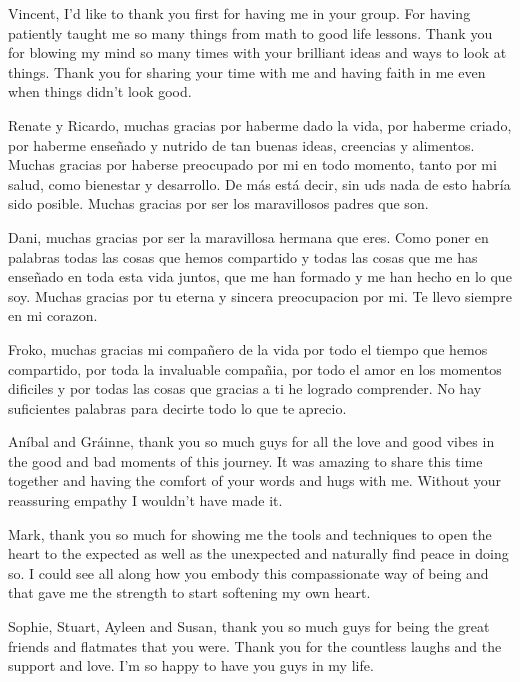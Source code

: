 \documentclass[phd,lfcs]{infthesis}
\begin{document}
\begin{preliminary}
\begin{acknowledgements}
  Vincent, I'd like to thank you first for having me in your group.
  For having patiently taught me so many things
  from math to good life lessons.
  Thank you for blowing my mind so many times
  with your brilliant ideas and ways to look at things.
  Thank you for sharing your time with me
  and having faith in me even when things didn't look good.

  Renate y Ricardo, muchas gracias por haberme dado la vida,
  por haberme criado, por haberme enseñado y nutrido
  de tan buenas ideas, creencias y alimentos.
  Muchas gracias por haberse preocupado por mi en todo momento,
  tanto por mi salud, como bienestar y desarrollo.
  De m\'as est\'a decir, sin uds nada de esto habr\'ia sido posible.
  Muchas gracias por ser los maravillosos padres que son.

  Dani, muchas gracias por ser la maravillosa hermana que eres.
  Como poner en palabras todas las cosas que hemos compartido
  y todas las cosas que me has enseñado en toda esta vida juntos,
  que me han formado y me han hecho en lo que soy.
  Muchas gracias por tu eterna y sincera preocupacion por mi.
  Te llevo siempre en mi corazon.

  Froko, muchas gracias mi compañero de la vida
  por todo el tiempo que hemos compartido,
  por toda la invaluable compañia,
  por todo el amor en los momentos dificiles
  y por todas las cosas que gracias a ti he logrado comprender.
  No hay suficientes palabras para decirte todo lo que te aprecio.

  An\'ibal and Gr\'ainne, thank you so much guys for all the love
  and good vibes in the good and bad moments of this journey.
  It was amazing to share this time together
  and having the comfort of your words and hugs with me.
  Without your reassuring empathy I wouldn't have made it.

  Mark, thank you so much
  for showing me the tools and techniques to open the heart
  to the expected as well as the unexpected
  and naturally find peace in doing so.
  I could see all along how you embody this compassionate way of being
  and that gave me the strength to start softening my own heart.

  Sophie, Stuart, Ayleen and Susan, thank you so much guys for
  being the great friends and flatmates that you were.
  Thank you for the countless laughs and the support and love.
  I'm so happy to have you guys in my life.


\end{acknowledgements}
\end{preliminary}
\end{document}
